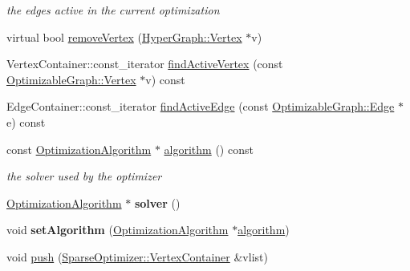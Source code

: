 \begin{DoxyCompactItemize}
\begin{DoxyCompactList}\small\item\em the edges active in the current optimization \end{DoxyCompactList}\item 
virtual bool \hyperlink{classg2o_1_1SparseOptimizer_a0fb2a5e2b250bf2530a600f6dcaad03f}{remove\-Vertex} (\hyperlink{classg2o_1_1HyperGraph_1_1Vertex}{Hyper\-Graph\-::\-Vertex} $\ast$v)
\item 
Vertex\-Container\-::const\-\_\-iterator \hyperlink{classg2o_1_1SparseOptimizer_a89ae01e9d070110a775d8a266717d719}{find\-Active\-Vertex} (const \hyperlink{classg2o_1_1OptimizableGraph_1_1Vertex}{Optimizable\-Graph\-::\-Vertex} $\ast$v) const 
\item 
Edge\-Container\-::const\-\_\-iterator \hyperlink{classg2o_1_1SparseOptimizer_a68b59bf6d56a390717b82b3ae009ccf0}{find\-Active\-Edge} (const \hyperlink{classg2o_1_1OptimizableGraph_1_1Edge}{Optimizable\-Graph\-::\-Edge} $\ast$e) const 
\item 
\hypertarget{classg2o_1_1SparseOptimizer_a7dad5beea6a44d92b1cc47c0e526a676}{const \hyperlink{classg2o_1_1OptimizationAlgorithm}{Optimization\-Algorithm} $\ast$ \hyperlink{classg2o_1_1SparseOptimizer_a7dad5beea6a44d92b1cc47c0e526a676}{algorithm} () const }\label{classg2o_1_1SparseOptimizer_a7dad5beea6a44d92b1cc47c0e526a676}

\begin{DoxyCompactList}\small\item\em the solver used by the optimizer \end{DoxyCompactList}\item 
\hypertarget{classg2o_1_1SparseOptimizer_aaa505e19f70caa4f0a8fe8eccdbcd768}{\hyperlink{classg2o_1_1OptimizationAlgorithm}{Optimization\-Algorithm} $\ast$ {\bfseries solver} ()}\label{classg2o_1_1SparseOptimizer_aaa505e19f70caa4f0a8fe8eccdbcd768}

\item 
\hypertarget{classg2o_1_1SparseOptimizer_a5ed7404ef361b479c75a0baf34e0a2bd}{void {\bfseries set\-Algorithm} (\hyperlink{classg2o_1_1OptimizationAlgorithm}{Optimization\-Algorithm} $\ast$\hyperlink{classg2o_1_1SparseOptimizer_a7dad5beea6a44d92b1cc47c0e526a676}{algorithm})}\label{classg2o_1_1SparseOptimizer_a5ed7404ef361b479c75a0baf34e0a2bd}

\item 
\hypertarget{classg2o_1_1SparseOptimizer_a08833d6f9ae487f5608f6113f3635b6b}{void \hyperlink{classg2o_1_1SparseOptimizer_a08833d6f9ae487f5608f6113f3635b6b}{push} (\hyperlink{structg2o_1_1OptimizableGraph_a54f01b9b6071e65e6abeebe4afb29dec}{Sparse\-Optimizer\-::\-Vertex\-Container} \&vlist)}\label{classg2o_1_1SparseOptimizer_a08833d6f9ae487f5608f6113f3635b6b}


\end{DoxyCompactItemize}
